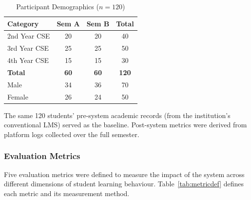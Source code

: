 \documentclass[conference]{IEEEtran}
\begin{document}
\begin{table}[h]
\caption{Participant Demographics ($n = 120$)}
\label{tab:participants}
\centering
\renewcommand{\arraystretch}{1.3}
\begin{tabular}{|l|c|c|c|}
\hline
\textbf{Category} & \textbf{Sem A} & \textbf{Sem B} & \textbf{Total} \\
\hline
2nd Year CSE & 20 & 20 & 40 \\
\hline
3rd Year CSE & 25 & 25 & 50 \\
\hline
4th Year CSE & 15 & 15 & 30 \\
\hline
\textbf{Total} & \textbf{60} & \textbf{60} & \textbf{120} \\
\hline
Male & 34 & 36 & 70 \\
\hline
Female & 26 & 24 & 50 \\
\hline
\end{tabular}
\end{table}

The same 120 students' pre-system academic records (from the institution's conventional LMS) served as the baseline. Post-system metrics were derived from platform logs collected over the full semester.

\subsubsection{Evaluation Metrics}

Five evaluation metrics were defined to measure the impact of the system across different dimensions of student learning behaviour. Table~\ref{tab:metricdef} defines each metric and its measurement method.
\end{document}
